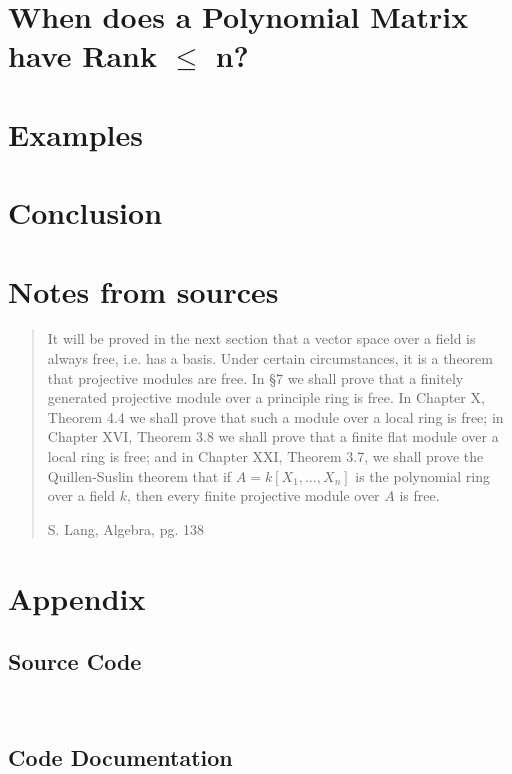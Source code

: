 \documentclass{amsart}
\theoremstyle{definition}
\theoremstyle{remark}
\numberwithin{equation}{section}
\begin{document}
\section{When does a Polynomial Matrix have Rank $\leq$ n?}
\label{sec:polynomial-matrix}

\section{Examples}

\section{Conclusion}

\newpage

\section*{Notes from sources}
\label{sec:notes-from-sources}

\blockquote[S. Lang, Algebra, pg. 138]{It will be proved in the next section that a vector space over a field is always free, i.e. has a basis. Under certain circumstances, it is a theorem that projective modules are free. In \S 7 we shall prove that a finitely generated projective module over a principle ring is free. In Chapter X, Theorem 4.4 we shall prove that such a module over a local ring is free; in Chapter XVI, Theorem 3.8 we shall prove that a finite flat module over a local ring is free; and in Chapter XXI, Theorem 3.7, we shall prove the Quillen-Suslin theorem that if $A = k[X_1, \ldots, X_n]$ is the polynomial ring over a field $k$, then every finite projective module over $A$ is free.}

\newpage

\section*{Appendix}

\subsection*{Source Code}

\leavevmode \\


\subsection*{Code Documentation}

\leavevmode \\


\newpage

\printbibliography
\end{document}
